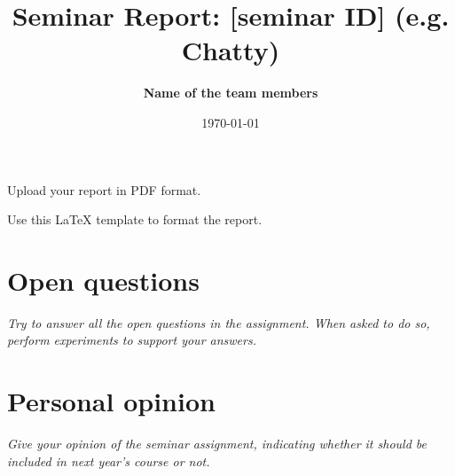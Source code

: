\documentclass[a4paper, 10pt]{article}
\title{Seminar Report: [seminar ID] (e.g. Chatty)}
\author{\textbf{Name of the team members}}
\date{\normalsize\today{}}
\begin{document}
\maketitle

\begin{center}
  Upload your report in PDF format.
  
  Use this LaTeX template to format the report.
\end{center}

\section{Open questions}

\textit{Try to answer all the open questions in the assignment. When asked to do so, perform experiments to support your answers.}

\section{Personal opinion}

\textit{Give your opinion of the seminar assignment, indicating whether it should be included in next year's course or not.}
\end{document}

